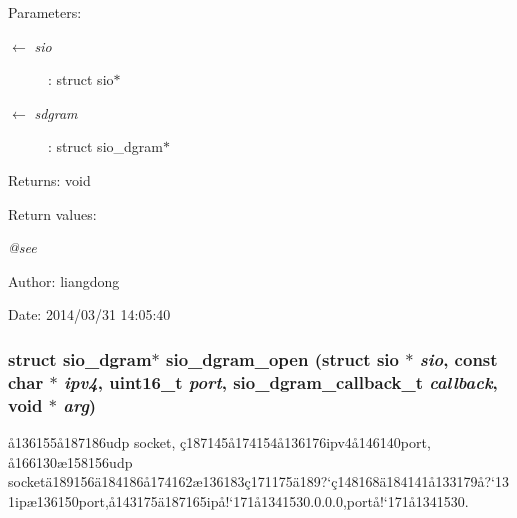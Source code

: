 \begin{Desc}
\item[Parameters:]
\begin{description}
\item[\mbox{$\leftarrow$} {\em sio}]: struct sio$\ast$ \item[\mbox{$\leftarrow$} {\em sdgram}]: struct sio\_\-dgram$\ast$ \end{description}
\end{Desc}
\begin{Desc}
\item[Returns:]void \end{Desc}
\begin{Desc}
\item[Return values:]
\begin{description}
\item[{\em @see}]\end{description}
\end{Desc}
\begin{Desc}
\item[Author:]liangdong \end{Desc}
\begin{Desc}
\item[Date:]2014/03/31 14:05:40 \end{Desc}
\subsubsection{\setlength{\rightskip}{0pt plus 5cm}struct sio\_\-dgram$\ast$ sio\_\-dgram\_\-open (struct sio $\ast$ {\em sio}, const char $\ast$ {\em ipv4}, uint16\_\-t {\em port}, sio\_\-dgram\_\-callback\_\-t {\em callback}, void $\ast$ {\em arg})}\label{sio__dgram_8h_a1}


\aa{}136155\aa{}187186udp socket, \c{c}187145\aa{}174154\aa{}136176ipv4\aa{}146140port, \aa{}166130\ae{}158156udp socket\"{a}189156\"{a}184186\aa{}174162\ae{}136183\c{c}171175\"{a}189?`\c{c}148168\"{a}184141\aa{}133179\aa{}?`131ip\ae{}136150port,\aa{}143175\"{a}187165ip\aa{}!`171\aa{}1341530.0.0.0,port\aa{}!`171\aa{}1341530. 

